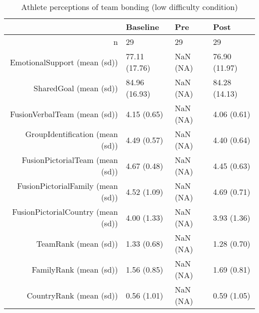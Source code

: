 \begin{table}[ht]
\centering
\begin{tabular}{rlll}
  \hline
 & Baseline & Pre & Post \\ 
  \hline
n &    29 &  29 &    29 \\ 
  EmotionalSupport (mean (sd)) & 77.11 (17.76) & NaN (NA) & 76.90 (11.97) \\ 
  SharedGoal (mean (sd)) & 84.96 (16.93) & NaN (NA) & 84.28 (14.13) \\ 
  FusionVerbalTeam (mean (sd)) &  4.15 (0.65) & NaN (NA) &  4.06 (0.61) \\ 
  GroupIdentification (mean (sd)) &  4.49 (0.57) & NaN (NA) &  4.40 (0.64) \\ 
  FusionPictorialTeam (mean (sd)) &  4.67 (0.48) & NaN (NA) &  4.45 (0.63) \\ 
  FusionPictorialFamily (mean (sd)) &  4.52 (1.09) & NaN (NA) &  4.69 (0.71) \\ 
  FusionPictorialCountry (mean (sd)) &  4.00 (1.33) & NaN (NA) &  3.93 (1.36) \\ 
  TeamRank (mean (sd)) &  1.33 (0.68) & NaN (NA) &  1.28 (0.70) \\ 
  FamilyRank (mean (sd)) &  1.56 (0.85) & NaN (NA) &  1.69 (0.81) \\ 
  CountryRank (mean (sd)) &  0.56 (1.01) & NaN (NA) &  0.59 (1.05) \\ 
   \hline
\end{tabular}
\caption{Athlete perceptions of 
 team bonding (low difficulty condition)} 
\end{table}

